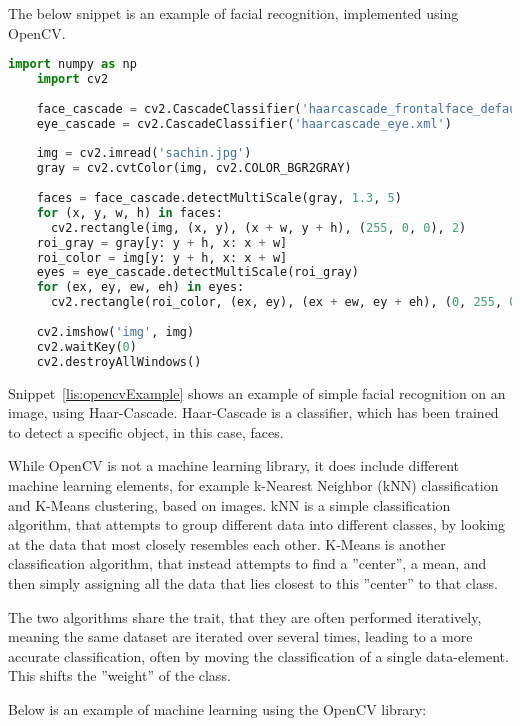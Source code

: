 The below snippet is an example of facial recognition, implemented using OpenCV.
\begin{lstlisting}[language=Python,label=lis:opencvExample,caption=Source code from the OpenCV documentation\cite{opencvHaarExample}.]
	import numpy as np
	import cv2
	
	face_cascade = cv2.CascadeClassifier('haarcascade_frontalface_default.xml')
	eye_cascade = cv2.CascadeClassifier('haarcascade_eye.xml')
	
	img = cv2.imread('sachin.jpg')
	gray = cv2.cvtColor(img, cv2.COLOR_BGR2GRAY)
	
	faces = face_cascade.detectMultiScale(gray, 1.3, 5)
	for (x, y, w, h) in faces:
	  cv2.rectangle(img, (x, y), (x + w, y + h), (255, 0, 0), 2)
	roi_gray = gray[y: y + h, x: x + w]
	roi_color = img[y: y + h, x: x + w]
	eyes = eye_cascade.detectMultiScale(roi_gray)
	for (ex, ey, ew, eh) in eyes:
	  cv2.rectangle(roi_color, (ex, ey), (ex + ew, ey + eh), (0, 255, 0), 2)
	
	cv2.imshow('img', img)
	cv2.waitKey(0)
	cv2.destroyAllWindows()
\end{lstlisting}
Snippet~\ref{lis:opencvExample} shows an example of simple facial recognition on an image, using Haar-Cascade.
Haar-Cascade is a classifier, which has been trained to detect a specific object, in this case, faces.

While OpenCV is not a machine learning library, it does include different machine learning elements, for example k-Nearest Neighbor (kNN) classification and K-Means clustering, based on images.
kNN is a simple classification algorithm, that attempts to group different data into different classes, by looking at the data that most closely resembles each other.
K-Means is another classification algorithm, that instead attempts to find a ''center'', a mean, and then simply assigning all the data that lies closest to this ''center'' to that class.

The two algorithms share the trait, that they are often performed iteratively, meaning the same dataset are iterated over several times, leading to a more accurate classification, often by moving the classification of a single data-element.
This shifts the ''weight'' of the class.

Below is an example of machine learning using the OpenCV library:

